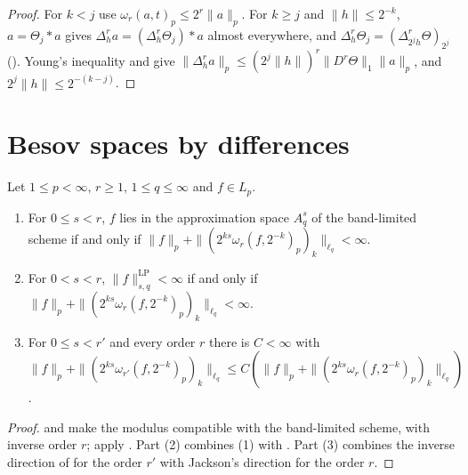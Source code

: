 \begin{proof}
\leanok
For $k < j$ use $\omega_r(a, t)_p \leq 2^r \|a\|_p$. For $k \geq j$ and $\|h\| \leq 2^{-k}$,
$a = \Theta_j * a$ gives $\Delta_h^r a = (\Delta_h^r \Theta_j) * a$ almost everywhere, and
$\Delta_h^r \Theta_j = (\Delta_{2^j h}^r \Theta)_{2^j}$ (). Young's
inequality and  give
$\|\Delta_h^r a\|_p \leq (2^j \|h\|)^r \|D^r \Theta\|_1 \|a\|_p$, and $2^j \|h\| \leq 2^{-(k-j)}$.
\end{proof}

\section{Besov spaces by differences}
\label{sec:rd-besov-differences}

\begin{theorem}
\label{thm:rd-besov}
\leanok
{}
Let $1 \leq p < \infty$, $r \geq 1$, $1 \leq q \leq \infty$ and $f \in L_p$.
\begin{enumerate}
  \item For $0 \leq s < r$, $f$ lies in the approximation space $A^s_q$ of the band-limited
    scheme if and only if $\|f\|_p + \|(2^{ks} \omega_r(f, 2^{-k})_p)_k\|_{\ell_q} < \infty$.
  \item For $0 < s < r$, $\|f\|^{\mathrm{LP}}_{s,q} < \infty$ if and only if
    $\|f\|_p + \|(2^{ks} \omega_r(f, 2^{-k})_p)_k\|_{\ell_q} < \infty$.
  \item For $0 \leq s < r'$ and every order $r$ there is $C < \infty$ with
    $\|f\|_p + \|(2^{ks} \omega_{r'}(f, 2^{-k})_p)_k\|_{\ell_q} \leq
    C (\|f\|_p + \|(2^{ks} \omega_r(f, 2^{-k})_p)_k\|_{\ell_q})$.
\end{enumerate}
\end{theorem}

\begin{proof}
\leanok
{} and  make the modulus compatible with the
band-limited scheme, with inverse order $r$; apply . Part (2)
combines (1) with . Part (3) combines the inverse direction of
 for the order $r'$ with Jackson's direction for the order $r$.
\end{proof}

